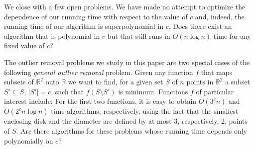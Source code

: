 \documentclass[lotsofwhite]{patmorin}
\begin{document}
We close with a few open problems. We have made no attempt to optimize
the dependence of our running time with respect to the value of $c$
and, indeed, the running time of our algorithm is superpolynomial in
$c$. Does there exist an algorithm that is polynomial in $c$ but that
still runs in $O(n\log n)$ time for any fixed value of $c$?

The outlier removal problems we study in this paper are two special
cases of the following \emph{general outlier removal} problem.  Given
any function $f$ that maps subsets of $\mathbb{R}^2$ onto $\mathbb{R}$
we want to find, for a given set $S$ of $n$ points in $\mathbb{R}^2$ a
subset $S'\subseteq S$, $|S'|=c$, such that $f(S\setminus S')$ is
minimum.  Functions $f$ of particular interest include:
For the first two functions, it is easy to obtain $O(3^c n)$ and
$O(2^cn\log n)$ time algorithms, respectively, using the fact that the
smallest enclosing disk and the diameter are defined by at most 3,
respectively, 2, points of $S$.  Are there algorithms for these
problems whose running time depends only polynomially on $c$?



\end{document}
